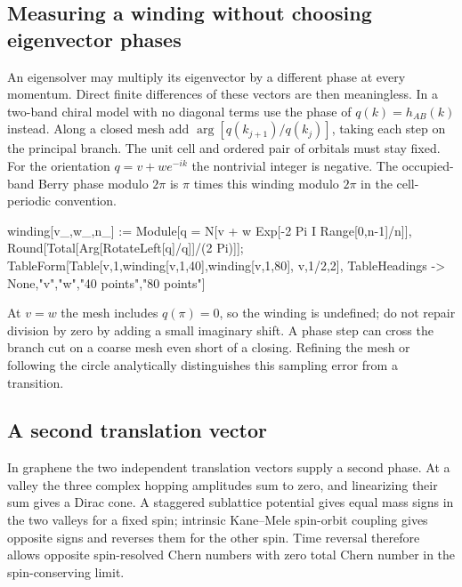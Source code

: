 \subsection{Measuring a winding without choosing eigenvector phases}
An eigensolver may multiply its eigenvector by a different phase at
every momentum. Direct finite differences of these vectors are then
meaningless. In a two-band chiral model with no diagonal terms use
the phase of $q(k)=h_{AB}(k)$ instead. Along a closed mesh add
$\arg[q(k_{j+1})/q(k_j)]$, taking each step on the principal branch.
The unit cell and ordered pair of orbitals must stay fixed. For the
orientation $q=v+w e^{-ik}$ the nontrivial integer is negative.
The occupied-band Berry phase modulo $2\pi$ is $\pi$ times this
winding modulo $2\pi$ in the cell-periodic convention.
\begin{wl}
winding[v_,w_,n_] := Module[{q = N[v + w Exp[-2 Pi I Range[0,n-1]/n]]},
  Round[Total[Arg[RotateLeft[q]/q]]/(2 Pi)]];
TableForm[Table[{v,1,winding[v,1,40],winding[v,1,80]}, {v,{1/2,2}}],
 TableHeadings -> {None,{"v","w","40 points","80 points"}}]
\end{wl}
At $v=w$ the mesh includes $q(\pi)=0$, so the winding is undefined;
do not repair division by zero by adding a small imaginary shift.
A phase step can cross the branch cut on a coarse mesh even short of
a closing. Refining the mesh or following the circle analytically
distinguishes this sampling error from a transition.

\subsection{A second translation vector}
In graphene the two independent translation vectors supply a second
phase. At a valley the three complex hopping amplitudes sum to zero,
and linearizing their sum gives a Dirac cone. A staggered sublattice
potential gives equal mass signs in the two valleys for a fixed spin;
intrinsic Kane--Mele spin-orbit coupling gives opposite signs and
reverses them for the other spin. Time reversal therefore allows
opposite spin-resolved Chern numbers with zero total Chern number in
the spin-conserving limit.

